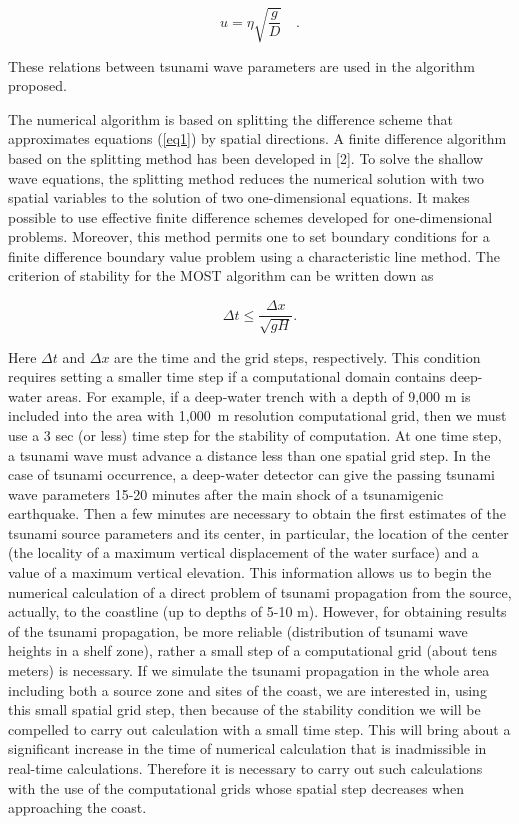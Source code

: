 \documentclass{aip-cp}
\begin{document}
\begin{equation}
\label{eq3}
u = \eta \sqrt {\frac{g}{D}} \quad .
\end{equation}

These relations between tsunami wave parameters are used in the algorithm 
proposed.

The numerical algorithm is based on splitting the difference scheme that 
approximates equations (\ref{eq1}) by spatial directions. A finite difference 
algorithm based on the splitting method has been developed in [2]. To solve 
the shallow wave equations, the splitting method reduces the numerical 
solution with two spatial variables to the solution of two one-dimensional 
equations. It makes possible to use effective finite difference schemes 
developed for one-dimensional problems. Moreover, this method permits one to 
set boundary conditions for a finite difference boundary value problem using 
a characteristic line method. The criterion of stability for the MOST 
algorithm can be written down as 

\begin{equation}
\label{eq4}
\Delta t \le \frac{\Delta x} { \sqrt{gH}} .
\end{equation}

Here $\Delta t$ and $\Delta x$ are the time and the grid steps, respectively. 
This condition requires setting a smaller time step if a computational 
domain contains deep-water areas. For example, if a deep-water trench with a 
depth of 9,000 m is included into the area with 1,000~m resolution 
computational grid, then we must use a 3 sec (or less) time step for the 
stability of computation. At one time step, a tsunami wave must advance a 
distance less than one spatial grid step. In the case of tsunami occurrence, 
a deep-water detector can give the passing tsunami wave parameters 15-20 
minutes after the main shock of a tsunamigenic earthquake. Then a few 
minutes are necessary to obtain the first estimates of the tsunami source 
parameters and its center, in particular, the location of the center (the 
locality of a maximum vertical displacement of the water surface) and a 
value of a maximum vertical elevation. This information allows us to begin 
the numerical calculation of a direct problem of tsunami propagation from 
the source, actually, to the coastline (up to depths of 5-10 m). However, 
for obtaining results of the tsunami propagation, be more reliable 
(distribution of tsunami wave heights in a shelf zone), rather a small step 
of a computational grid (about tens meters) is necessary. If we simulate the 
tsunami propagation in the whole area including both a source zone and sites 
of the coast, we are interested in, using this small spatial grid step, then 
because of the stability condition we will be compelled to carry out 
calculation with a small time step. This will bring about a significant 
increase in the time of numerical calculation that is inadmissible in 
real-time calculations. Therefore it is necessary to carry out such 
calculations with the use of the computational grids whose spatial step 
decreases when approaching the coast.
\end{document}
